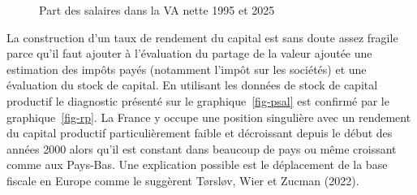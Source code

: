 \documentclass[
  french,
  9pt,
  a4paper,
]{article}
\begin{document}
\begin{figure}[H]

\caption{\label{fig-psaleu}Part des salaires dans la VA nette 1995 et
2025}


\end{figure}%

La construction d'un taux de rendement du capital est sans doute assez
fragile parce qu'il faut ajouter à l'évaluation du partage de la valeur
ajoutée une estimation des impôts payés (notamment l'impôt sur les
sociétés) et une évaluation du stock de capital. En utilisant les
données de stock de capital productif le diagnostic présenté sur le
graphique~\ref{fig-psal} est confirmé par le graphique~\ref{fig-rp}. La
France y occupe une position singulière avec un rendement du capital
productif particulièrement faible et décroissant depuis le début des
années 2000 alors qu'il est constant dans beaucoup de pays ou même
croissant comme aux Pays-Bas. Une explication possible est le
déplacement de la base fiscale en Europe comme le suggèrent Tørsløv,
Wier et Zucman (2022).
\end{document}
